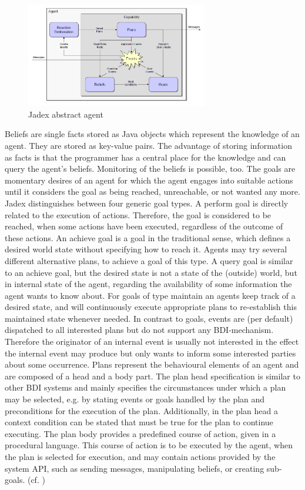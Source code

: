 \begin{figure}
	\centering
	\includegraphics[width=300px]{images/Jadex_agent.png}
	\caption{Jadex abstract agent \cite{Pokahr}}
	\label{fig2}
\end{figure}
Beliefs are single facts stored as Java objects which represent the knowledge of an agent. They are stored as key-value pairs. The advantage of storing information as facts is that the programmer has a central place for the knowledge and can query the agent's beliefs. Monitoring of the beliefs is possible, too.
The goals are momentary desires of an agent for which the agent engages into suitable actions until it considers the goal as being reached, unreachable, or not wanted any more. Jadex distinguishes between four generic goal types. A perform goal is directly related to the execution of actions. Therefore, the goal is considered to be reached, when some actions have been executed, regardless of the outcome of these actions. An achieve goal is a goal in the traditional sense, which defines a desired world state without specifying how to reach it. Agents may try several different alternative plans, to achieve a goal of this type. A query goal is similar to an achieve goal, but the desired state is not a state of the (outside) world, but in internal state of the agent, regarding the availability of some information the agent wants to know about. For goals of type maintain an agents keep track of a desired state, and will continuously execute appropriate plans to re-establish this maintained state whenever needed. In contrast to goals, events are (per default) dispatched to all interested plans but do not support any BDI-mechanism. Therefore the originator of an internal event is usually not interested in the effect the internal event may produce but only wants to inform some interested parties about some occurrence. Plans represent the behavioural elements of an agent and are composed of a head and a body part. The plan head specification is similar to other BDI systems and mainly specifies the circumstances under which a plan may be selected, e.g. by stating events or goals handled by the plan and preconditions for the execution of the plan. Additionally, in the plan head a context condition can be stated that must be true for the plan to continue executing. The plan body provides a predefined course of action, given in a procedural language. This course of action is to be executed by the agent, when the plan is selected for execution, and may contain actions provided by the system API, such as sending messages, manipulating beliefs, or creating sub-goals. (cf. \cite{Pokahr2})

